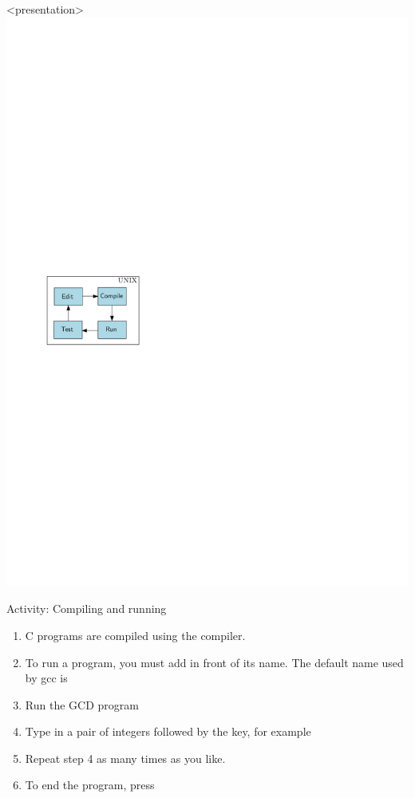 \begin{frame}<presentation>
\includegraphics[page=3,width=\textwidth]{flow}
\end{frame}

\begin{frame}{Activity: Compiling and running}
\begin{enumerate}
\item C programs are compiled using the  compiler.
\item To run a program, you must add  in front of its name. The default
name used by gcc is 
\item Run the GCD program
\item Type in a pair of integers followed by the  key, for example
\item Repeat step 4 as many times as you like.  
\item To end the program, press 
\end{enumerate}


\end{frame}

